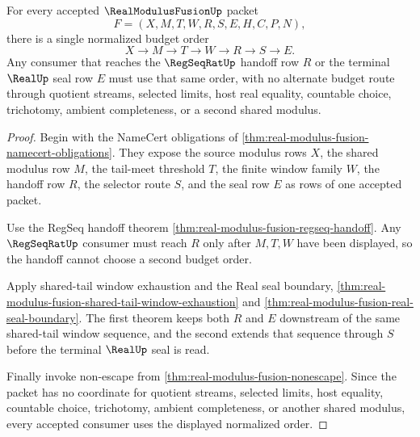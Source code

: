 \begin{theorem}
\label{thm:real-modulus-fusion-shared-budget-normalization}
For every accepted $\RealModulusFusionUp$ packet
$$
F=(X,M,T,W,R,S,E,H,C,P,N),
$$
there is a single normalized budget order
$$
X \longrightarrow M \longrightarrow T \longrightarrow W \longrightarrow R \longrightarrow S \longrightarrow E.
$$
Any consumer that reaches the $\RegSeqRatUp$ handoff row $R$ or the terminal $\RealUp$ seal row $E$ must use that same order, with no alternate budget route through quotient streams, selected limits, host real equality, countable choice, trichotomy, ambient completeness, or a second shared modulus.
\end{theorem}
\begin{proof}
Begin with the NameCert obligations of \autoref{thm:real-modulus-fusion-namecert-obligations}. They expose the source modulus rows $X$, the shared modulus row $M$, the tail-meet threshold $T$, the finite window family $W$, the handoff row $R$, the selector route $S$, and the seal row $E$ as rows of one accepted packet.

Use the RegSeq handoff theorem \autoref{thm:real-modulus-fusion-regseq-handoff}. Any $\RegSeqRatUp$ consumer must reach $R$ only after $M,T,W$ have been displayed, so the handoff cannot choose a second budget order.

Apply shared-tail window exhaustion and the Real seal boundary, \autoref{thm:real-modulus-fusion-shared-tail-window-exhaustion} and \autoref{thm:real-modulus-fusion-real-seal-boundary}. The first theorem keeps both $R$ and $E$ downstream of the same shared-tail window sequence, and the second extends that sequence through $S$ before the terminal $\RealUp$ seal is read.

Finally invoke non-escape from \autoref{thm:real-modulus-fusion-nonescape}. Since the packet has no coordinate for quotient streams, selected limits, host equality, countable choice, trichotomy, ambient completeness, or another shared modulus, every accepted consumer uses the displayed normalized order.
\end{proof}

